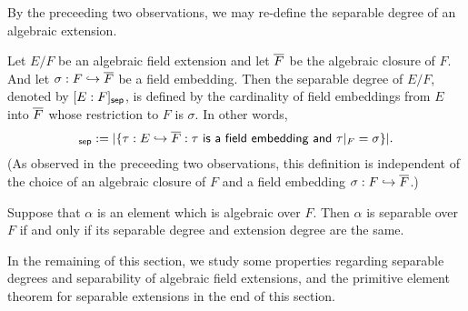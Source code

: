 By the preceeding two observations, we may re-define the separable degree of an algebraic extension.
\begin{defi}
    Let $E/F$ be an algebraic field extension and let $\overline{F}$ be the algebraic closure of $F$.
    And let $\sigma: F\hookrightarrow\overline{F}$ be a field embedding.
    Then the separable degree of $E/F$, denoted by $[E:F]_{\textsf{sep}}$, is defined by the cardinality of field embeddings from $E$ into $\overline{F}$ whose restriction to $F$ is $\sigma$.
    In other words,
    \begin{align*}
        [E:F]_\sep:=|\{\tau: E\hookrightarrow\ol F: \textsf{$\tau$ is a field embedding and $\tau|_F=\sigma$}\}|.
    \end{align*}
    (As observed in the preceeding two observations, this definition is independent of the choice of an algebraic closure of $F$ and a field embedding $\sigma: F\hookrightarrow\overline{F}$.)
\end{defi}
\begin{rmk}
    Suppose that $\alpha$ is an element which is algebraic over $F$.
    Then $\alpha$ is separable over $F$ if and only if its separable degree and extension degree are the same.
\end{rmk}

In the remaining of this section, we study some properties regarding separable degrees and separability of algebraic field extensions, and the primitive element theorem for separable extensions in the end of this section.

